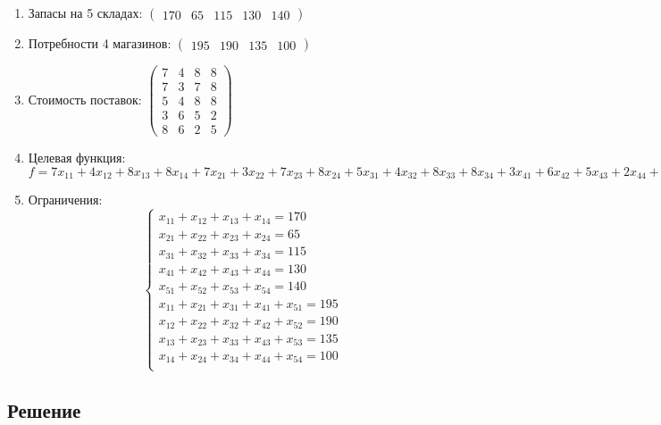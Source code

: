 \begin{enumerate}
    \item Запасы на 5 складах: $\begin{pmatrix}
                  170 & 65 & 115 & 130 & 140
              \end{pmatrix}$
    \item Потребности 4 магазинов: $\begin{pmatrix}
                  195 & 190 & 135 & 100
              \end{pmatrix}$
    \item Стоимость поставок: $\begin{pmatrix}
                  7 & 4 & 8 & 8 \\
                  7 & 3 & 7 & 8 \\
                  5 & 4 & 8 & 8 \\
                  3 & 6 & 5 & 2 \\
                  8 & 6 & 2 & 5
              \end{pmatrix}$
    \item Целевая функция: $f = 7x_{11} + 4x_{12} + 8x_{13} + 8x_{14} + 7x_{21} + 3x_{22} + 7x_{23} + 8x_{24} + 5x_{31} + 4x_{32} + 8x_{33} + 8x_{34} + 3x_{41} + 6x_{42} + 5x_{43} + 2x_{44} + 8x_{51} + 6x_{52} + 2x_{53} + 5x_{54} \to \min$
    
    \item Ограничения:
    \[\begin{cases}
        x_{11} + x_{12} + x_{13} + x_{14} = 170 \\
        x_{21} + x_{22} + x_{23} + x_{24} = 65 \\
        x_{31} + x_{32} + x_{33} + x_{34} = 115 \\
        x_{41} + x_{42} + x_{43} + x_{44} = 130 \\
        x_{51} + x_{52} + x_{53} + x_{54} = 140 \\
        x_{11} + x_{21} + x_{31} + x_{41} + x_{51} = 195 \\
        x_{12} + x_{22} + x_{32} + x_{42} + x_{52} = 190 \\
        x_{13} + x_{23} + x_{33} + x_{43} + x_{53} = 135 \\
        x_{14} + x_{24} + x_{34} + x_{44} + x_{54} = 100 \\
    \end{cases}\]
\end{enumerate}

\subsection{Решение}\label{05-lab-solution}

